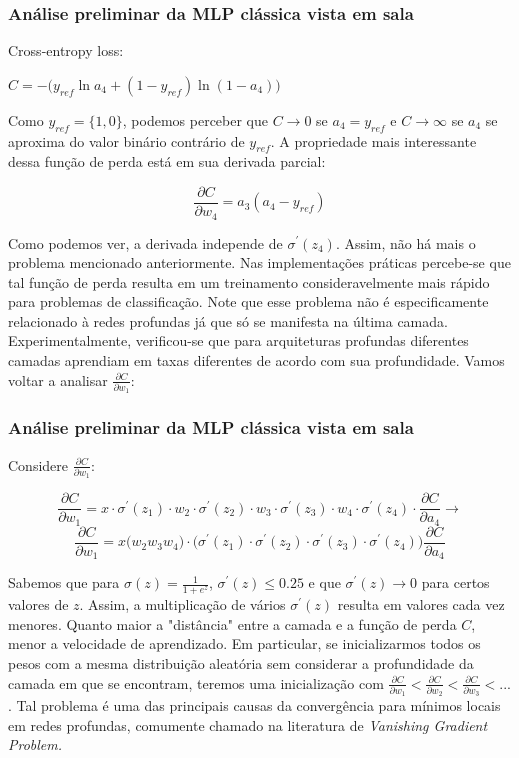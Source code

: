 \documentclass[tikz,10pt]{beamer}
\begin{document}
\begin{frame}
	\frametitle{Análise preliminar da MLP clássica vista em sala}
    	
    	Cross-entropy loss:
    	
    	$C = - \bigg(y_{ref} \ln{a_4} + (1-y_{ref}) \ln{(1 - a_4)} \bigg)$
    	
    	Como $y_{ref} = \{1,0\}$, podemos perceber que $C \rightarrow 0$ se $a_4 = y_{ref}$ e $C \rightarrow \infty$ se $a_4$ se aproxima do valor binário contrário de $y_{ref}$. A propriedade mais interessante dessa função de perda está em sua derivada parcial:
    	
    	$$\frac{ \partial C } {\partial w_4 } = a_3(a_4 - y_{ref})$$
    	
    	Como podemos ver, a derivada independe de $\sigma^{'}(z_4)$. Assim, não há mais o problema mencionado anteriormente. Nas implementações práticas percebe-se que tal função de perda resulta em um treinamento consideravelmente mais rápido para problemas de classificação. Note que esse problema não é especificamente relacionado à redes profundas já que só se manifesta na última camada. Experimentalmente, verificou-se que para arquiteturas profundas diferentes camadas aprendiam em taxas diferentes de acordo com sua profundidade. Vamos voltar a analisar $\frac{\partial C}{\partial w_1}$:
    	

\end{frame}

\begin{frame}
	\frametitle{Análise preliminar da MLP clássica vista em sala}
	 Considere $\frac{\partial C}{\partial w_1}$:
	 
	$$ \frac{\partial C}{\partial w_1} = x \cdot \sigma^{'}(z_1) \cdot w_2 \cdot \sigma^{'}(z_2) \cdot w_3 \cdot \sigma^{'}(z_3) \cdot w_4 \cdot  \sigma^{'}(z_4)\cdot\frac{\partial C}{\partial a_4} \rightarrow $$
	$$ \frac{\partial C}{\partial w_1} = x \bigg(w_2 w_3 w_4 \bigg) \cdot \bigg(\sigma^{'}(z_1) \cdot \sigma^{'}(z_2)\cdot \sigma^{'}(z_3) \cdot \sigma^{'}(z_4) \bigg) \frac{\partial C}{\partial a_4} $$
	
	Sabemos que para $\sigma(z) = \frac{1}{1 + e^z}$, $\sigma^{'}(z) \leq 0.25$ e que $\sigma^{'}(z) \rightarrow 0$ para certos valores de $z$. Assim, a multiplicação de vários $\sigma^{'}(z)$ resulta em valores cada vez menores. Quanto maior a "distância" entre a camada e a função de perda $C$, menor a velocidade de aprendizado. Em particular, se inicializarmos todos os pesos com a mesma distribuição aleatória sem considerar a profundidade da camada em que se encontram, teremos uma inicialização com $\frac{\partial C}{\partial w_1} < \frac{\partial C}{\partial w_2} < \frac{\partial C}{\partial w_3} < ... $ . Tal problema é uma das principais causas da convergência para mínimos locais em redes profundas, comumente chamado na literatura de \it{Vanishing Gradient Problem}.
	
\end{frame}
\end{document}
